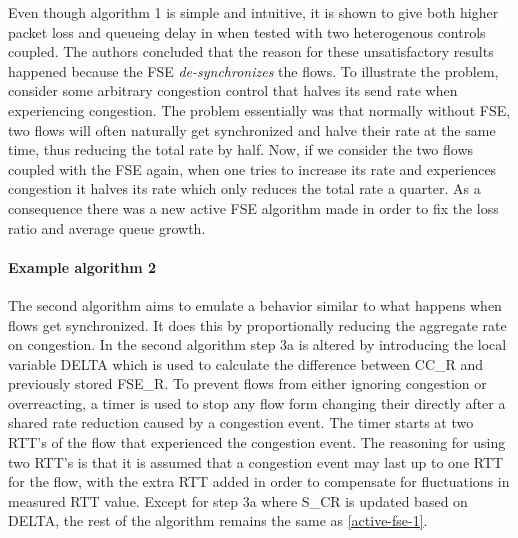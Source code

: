 \documentclass[UKenglish]{ifimaster}
\begin{document}
Even though algorithm 1 is simple and intuitive, it is shown to give both higher packet loss and queueing delay in \cite{10.1145/2740070.2630089} when tested with two heterogenous controls coupled. 
The authors concluded that the reason for these unsatisfactory results happened because the FSE \textit{de-synchronizes} the flows.
To illustrate the problem, consider some arbitrary congestion control that halves its send rate when experiencing congestion.
The problem essentially was that normally without FSE, two flows will often naturally get synchronized and halve their rate at the same time, thus reducing the total rate by half.
Now, if we consider the two flows coupled with the FSE again, when one tries to increase its rate and experiences congestion it halves its rate which only reduces the total rate a quarter.
As a consequence there was a new active FSE algorithm made in order to fix the loss ratio and average queue growth.
\paragraph{Example algorithm 2}
The second algorithm aims to emulate a behavior similar to what happens when flows get synchronized.
It does this by proportionally reducing the aggregate rate on congestion.
In the second algorithm step 3a is altered by introducing the local variable DELTA which is used to calculate the difference between CC\_R and previously stored FSE\_R. 
To prevent flows from either ignoring congestion or overreacting, a timer is used to stop any flow form changing their directly after a shared rate reduction caused by a congestion event. 
The timer starts at two RTT's of the flow that experienced the congestion event.
The reasoning for using two RTT's is that it is assumed that a congestion event may last up to one RTT for the flow, with the extra RTT added in order to compensate for fluctuations in measured RTT value.
Except for step 3a where S\_CR is updated based on DELTA, the rest of the algorithm remains the same as \ref{active-fse-1}.

\end{document}

